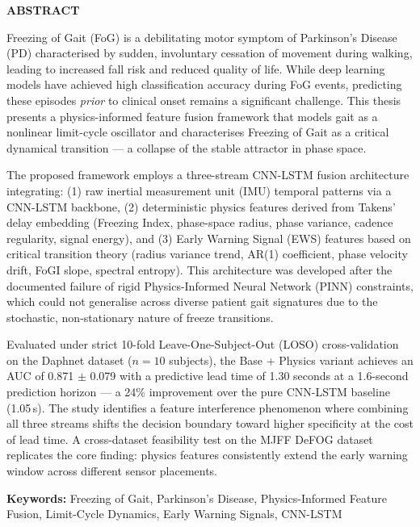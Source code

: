 \documentclass[12pt,a4paper,oneside]{report}
\numberwithin{equation}{chapter}
\numberwithin{figure}{chapter}
\numberwithin{table}{chapter}
\begin{document}
\newpage


\begin{center}
\hspace*{-0.25in}
\begin{minipage}{\dimexpr\textwidth+0.5in\relax}
\centering
{\fontsize{14}{16}\selectfont\bfseries ABSTRACT}
\end{minipage}
\end{center}

\vspace{0.5cm}

\begin{onehalfspacing}
Freezing of Gait (FoG) is a debilitating motor symptom of Parkinson's Disease (PD) characterised by sudden, involuntary cessation of movement during walking, leading to increased fall risk and reduced quality of life. While deep learning models have achieved high classification accuracy during FoG events, predicting these episodes \textit{prior} to clinical onset remains a significant challenge. This thesis presents a physics-informed feature fusion framework that models gait as a nonlinear limit-cycle oscillator and characterises Freezing of Gait as a critical dynamical transition --- a collapse of the stable attractor in phase space.

The proposed framework employs a three-stream CNN-LSTM fusion architecture integrating: (1) raw inertial measurement unit (IMU) temporal patterns via a CNN-LSTM backbone, (2) deterministic physics features derived from Takens' delay embedding (Freezing Index, phase-space radius, phase variance, cadence regularity, signal energy), and (3) Early Warning Signal (EWS) features based on critical transition theory (radius variance trend, AR(1) coefficient, phase velocity drift, FoGI slope, spectral entropy). This architecture was developed after the documented failure of rigid Physics-Informed Neural Network (PINN) constraints, which could not generalise across diverse patient gait signatures due to the stochastic, non-stationary nature of freeze transitions.

Evaluated under strict 10-fold Leave-One-Subject-Out (LOSO) cross-validation on the Daphnet dataset ($n = 10$ subjects), the Base + Physics variant achieves an AUC of 0.871 $\pm$ 0.079 with a predictive lead time of 1.30 seconds at a 1.6-second prediction horizon --- a 24\% improvement over the pure CNN-LSTM baseline (1.05\,s). The study identifies a feature interference phenomenon where combining all three streams shifts the decision boundary toward higher specificity at the cost of lead time. A cross-dataset feasibility test on the MJFF DeFOG dataset replicates the core finding: physics features consistently extend the early warning window across different sensor placements.

\vspace{0.8cm}

\noindent\textbf{Keywords:} Freezing of Gait, Parkinson's Disease, Physics-Informed Feature Fusion, Limit-Cycle Dynamics, Early Warning Signals, CNN-LSTM
\end{onehalfspacing}
\end{document}
